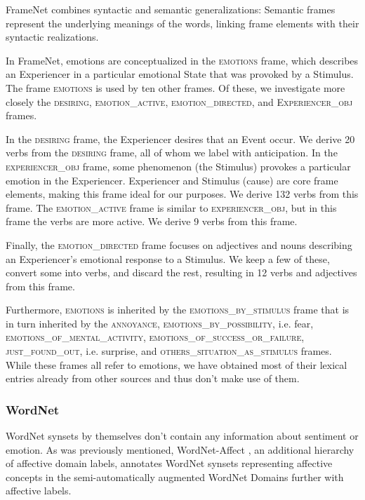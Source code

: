 FrameNet \cite{framenet} combines syntactic and semantic generalizations: Semantic frames represent the underlying meanings of the words, linking frame elements with their syntactic realizations.

In FrameNet, emotions are conceptualized in the \textsc{emotions} frame, which describes an Experiencer in a particular emotional State that was provoked by a Stimulus. The frame \textsc{emotions} is used by ten other frames. Of these, we investigate more closely the \textsc{desiring}, \textsc{emotion\_active}, \textsc{emotion\_directed}, and \textsc{Experiencer\_obj} frames.

In the \textsc{desiring} frame, the Experiencer desires that an Event occur. We derive 20 verbs from the \textsc{desiring} frame, all of whom we label with anticipation. In the \textsc{experiencer\_obj} frame, some phenomenon (the Stimulus) provokes a particular emotion in the Experiencer. Experiencer and Stimulus (cause) are core frame elements, making this frame ideal for our purposes. We derive 132 verbs from this frame. The \textsc{emotion\_active} frame is similar to \textsc{experiencer\_obj}, but in this frame the verbs are more active. We derive 9 verbs from this frame.

Finally, the \textsc{emotion\_directed} frame focuses on adjectives and nouns describing an Experiencer's emotional response to a Stimulus. We keep a few of these, convert some into verbs, and discard the rest, resulting in 12 verbs and adjectives from this frame.

Furthermore, \textsc{emotions} is inherited by the \textsc{emotions\_by\_stimulus} frame that is in turn inherited by the \textsc{annoyance}, \textsc{emotions\_by\_possibility}, i.e. fear, \textsc{emotions\_of\_mental\_activity}, \textsc{emotions\_of\_success\_or\_failure}, \textsc{just\_found\_out}, i.e. surprise, and \textsc{others\_situation\_as\_stimulus} frames.
While these frames all refer to emotions, we have obtained most of their lexical entries already from other sources and thus don't make use of them.

\subsubsection{WordNet}

WordNet \cite{wordnet} synsets by themselves don't contain any information about sentiment or emotion. As was previously mentioned, WordNet-Affect \cite{wordnet-affect}, an additional hierarchy of affective domain labels, annotates WordNet synsets representing affective concepts in the semi-automatically augmented WordNet Domains further with affective labels.

